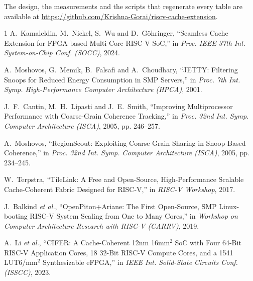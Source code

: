 \documentclass[conference]{IEEEtran}
\begin{document}
\ifanon
\else
The design, the measurements and the scripts that regenerate every table are
available at \url{https://github.com/Krishna-Gorai/riscv-cache-extension}.
\fi

\newpage
\begin{thebibliography}{1}
A.~Kamaleldin, M.~Nickel, S.~Wu and D.~G\"ohringer,
``Seamless Cache Extension for FPGA-based Multi-Core RISC-V SoC,''
in \emph{Proc. IEEE 37th Int. System-on-Chip Conf. (SOCC)}, 2024.

A.~Moshovos, G.~Memik, B.~Falsafi and A.~Choudhary,
``JETTY: Filtering Snoops for Reduced Energy Consumption in SMP Servers,''
in \emph{Proc. 7th Int. Symp. High-Performance Computer Architecture (HPCA)},
2001.

J.~F.~Cantin, M.~H.~Lipasti and J.~E.~Smith,
``Improving Multiprocessor Performance with Coarse-Grain Coherence Tracking,''
in \emph{Proc. 32nd Int. Symp. Computer Architecture (ISCA)}, 2005, pp.
246--257.

A.~Moshovos,
``RegionScout: Exploiting Coarse Grain Sharing in Snoop-Based Coherence,''
in \emph{Proc. 32nd Int. Symp. Computer Architecture (ISCA)}, 2005, pp.
234--245.

W.~Terpstra,
``TileLink: A Free and Open-Source, High-Performance Scalable Cache-Coherent
Fabric Designed for RISC-V,'' in \emph{RISC-V Workshop}, 2017.

J.~Balkind \emph{et al.},
``OpenPiton+Ariane: The First Open-Source, SMP Linux-booting RISC-V System
Scaling from One to Many Cores,'' in \emph{Workshop on Computer Architecture
Research with RISC-V (CARRV)}, 2019.

A.~Li \emph{et al.},
``CIFER: A Cache-Coherent 12nm 16mm$^2$ SoC with Four 64-Bit RISC-V Application
Cores, 18 32-Bit RISC-V Compute Cores, and a 1541 LUT6/mm$^2$ Synthesizable
eFPGA,'' in \emph{IEEE Int. Solid-State Circuits Conf. (ISSCC)}, 2023.
\end{thebibliography}
\end{document}
